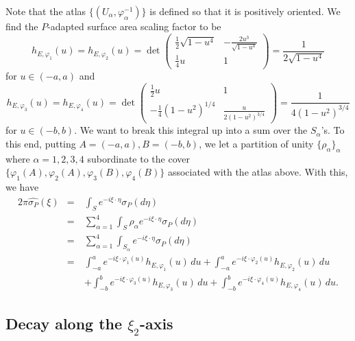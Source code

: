 \documentclass[11pt, letter]{book}
\renewcommand\det{\operatorname{det}}
\newcommand{\f}[2]{\frac{#1}{#2}}
\newcommand{\al}{\alpha}
\begin{document}
\noindent Note that the atlas $\{ (U_\al, \varphi^{-1}_\al) \}$ is defined so that it is positively oriented. We find the $P$-adapted surface area scaling factor to be 
\begin{equation*}
    h_{E,\varphi_1}(u) = h_{E,\varphi_2}(u) = {\det \begin{pmatrix} 
    \f{1}{2}\sqrt{1-u^4} &  -\f{2u^3}{\sqrt{1-u^4}} \\
    \f{1}{4}u & 1
    \end{pmatrix}} = \f{1}{2\sqrt{1-u^4}}
\end{equation*}
for $u\in(-a,a)$ and
\begin{equation*}
    h_{E,\varphi_3}(u) = h_{E,\varphi_4}(u) = {\det\begin{pmatrix}
    \f{1}{2}u&  1  \\
    -\f{1}{4}(1-u^2)^{1/4}  & \f{u}{2(1-u^2)^{3/4}}
    \end{pmatrix}} = \f{1}{4(1 - u^2)^{3/4}}
\end{equation*}
for $u\in(-b,b)$. We want to break this integral up into a sum over the $S_\al$'s. To this end, putting $A = (-a,a), B = (-b,b)$, we let a partition of unity $\{\rho_\al\}_\al$ where $\al=1,2,3,4$ subordinate to the cover $\{ \varphi_1(A), \varphi_2(A), \varphi_3(B), \varphi_4(B)\}$ associated with the atlas above. With this, we have
\begin{eqnarray*}
    2\pi \widehat{\sigma_P}(\xi) 
    &=& \int_S e^{-i \xi \cdot \eta }\sigma_P (d\eta) \\
    &=& \sum^{4}_{\al = 1} \int_{S} \rho_\al e^{-i \xi \cdot \eta} \sigma_P(d\eta)\\
    &=& \sum^{4}_{\al = 1} \int_{S_\al} e^{-i \xi \cdot \eta} \sigma_P(d\eta)\\
    &=& \int_{-a}^a  e^{-i \xi \cdot \varphi_1(u)} h_{E,\varphi_1}(u)\,du  + \int_{-a}^a  e^{-i \xi \cdot \varphi_2(u)} h_{E,\varphi_2}(u)\,du \\
    &\quad& + \int_{-b}^b e^{-i \xi \cdot \varphi_3(u)} h_{E,\varphi_3}(u)\,du + \int_{-b}^b e^{-i \xi \cdot \varphi_4(u)} h_{E,\varphi_4}(u)\,du.
\end{eqnarray*}


\subsection{Decay along the $\xi_2$-axis}
\end{document}
